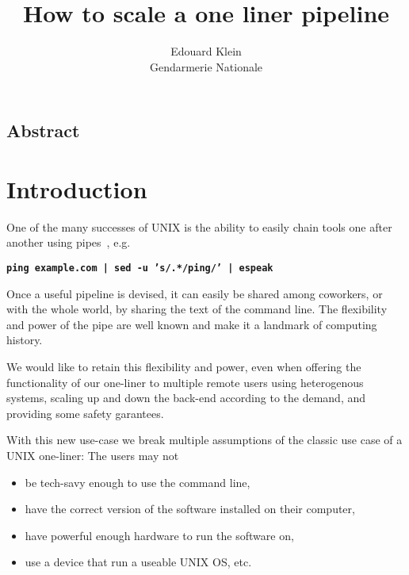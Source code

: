 \documentclass[letterpaper,twocolumn,10pt]{article}
\begin{document}
\date{}

\title{\Large \bf How to scale a one liner pipeline}


\author{
{\rm Edouard Klein}\\
Gendarmerie Nationale
} %

\maketitle



\subsection*{Abstract}

\section{Introduction}
One of the many successes of UNIX is the ability to easily chain tools one after another using pipes~\cite{ritchie1984}, e.g.

{\bf \tt ping example.com | sed -u 's/.*/ping/' | espeak \\}

Once a useful pipeline is devised, it can easily be shared among coworkers, or with the whole world, by sharing the text of the command line\cite{commandlinefucom,climagic}.
The flexibility and power of the pipe are well known and make it a landmark of computing history.

We would like to retain this flexibility and power, even when offering the functionality of our one-liner to multiple remote users using heterogenous systems, scaling up and down the back-end according to the demand, and providing some safety garantees.

With this new use-case we break multiple assumptions of the classic use case of a UNIX one-liner: The users may not
\begin{itemize}
\item be tech-savy enough to use the command line,
\item have the correct version of the software installed on their computer,
\item have powerful enough hardware to run the software on,
\item use a device that run a useable UNIX OS, etc.
\end{itemize}
\end{document}
